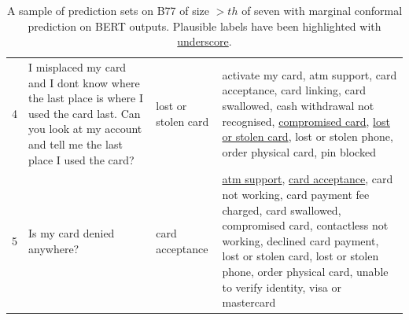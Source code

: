 \documentclass[11pt]{article}
\begin{document}
\begin{table}[h!]
\begin{tabular}{l p{} p{} p{}}
4 & I misplaced my card and I dont know where the last place is where I used the card last. Can you look at my account and tell me the last place I used the card? & lost or stolen card & activate my card, atm support, card acceptance, card linking, card swallowed, cash withdrawal not recognised, \underline{compromised card}, \underline{lost or stolen card}, lost or stolen phone, order physical card, pin blocked \\
5 & Is my card denied anywhere? & card acceptance & \underline{atm support}, \underline{card acceptance}, card not working, card payment fee charged, card swallowed, compromised card, contactless not working, declined card payment, lost or stolen card, lost or stolen phone, order physical card, unable to verify identity, visa or mastercard \\
         \bottomrule
    \end{tabular}
    \caption{A sample of prediction sets on B77 of size $>th$ of seven with marginal conformal prediction on BERT outputs. Plausible labels have been highlighted with \underline{underscore}.}
    \label{tab:ambiguous_inputs2}
\end{table}
\end{document}
